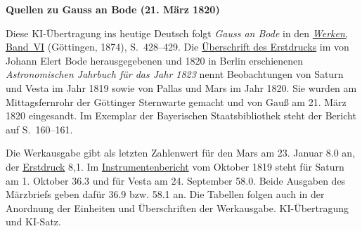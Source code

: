 \clearpage\thispagestyle{empty}
\begin{center}\textbf{Quellen zu Gauss an Bode (21. März 1820)}\end{center}
\noindent Diese KI-Übertragung ins heutige Deutsch folgt \textit{Gauss an Bode} in den \href{https://gdz.sub.uni-goettingen.de/id/PPN236007467}{\textit{Werken}, Band~VI} (Göttingen, 1874), S.~428--429. Die \href{https://api.digitale-sammlungen.de/iiif/image/v2/bsb10538352_00166/full/1600,/0/default.jpg}{Überschrift des Erstdrucks} im von Johann Elert Bode herausgegebenen und 1820 in Berlin erschienenen \textit{Astronomischen Jahrbuch für das Jahr 1823} nennt Beobachtungen von Saturn und Vesta im Jahr 1819 sowie von Pallas und Mars im Jahr 1820. Sie wurden am Mittagsfernrohr der Göttinger Sternwarte gemacht und von Gauß am 21. März 1820 eingesandt. Im Exemplar der Bayerischen Staatsbibliothek steht der Bericht auf S.~160--161.
\par\smallskip\noindent Die Werkausgabe gibt als letzten Zahlenwert für den Mars am 23. Januar 8.0 an, der \href{https://api.digitale-sammlungen.de/iiif/image/v2/bsb10538352_00167/full/1600,/0/default.jpg}{Erstdruck} 8,1. Im \hyperlink{native-427-part-lower}{Instrumentenbericht} vom Oktober 1819 steht für Saturn am 1. Oktober 36.3 und für Vesta am 24. September 58.0. Beide Ausgaben des Märzbriefs geben dafür 36.9 bzw. 58.1 an. Die Tabellen folgen auch in der Anordnung der Einheiten und Überschriften der Werkausgabe. KI-Übertragung und KI-Satz.
\clearpage
